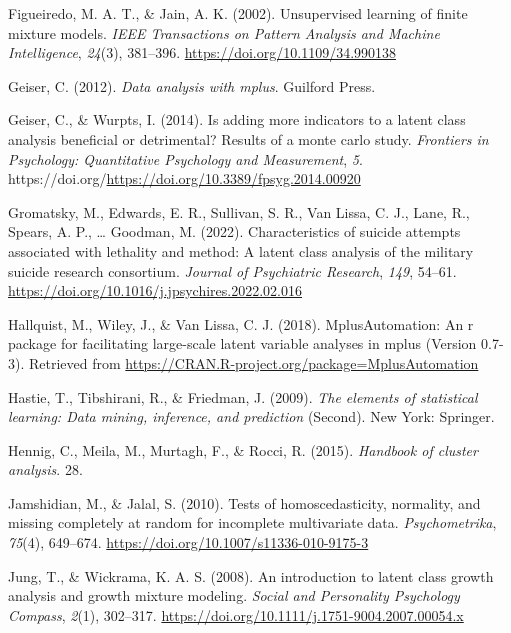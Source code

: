 \documentclass[
  ,man,floatsintext]{apa6}
\newlength{\cslhangindent}
\newlength{\cslentryspacingunit} %
\newenvironment{CSLReferences}[2] %
 {%
  \setlength{\parindent}{0pt}
  \ifodd #1
  \let\oldpar\par
  \def\par{\hangindent=\cslhangindent\oldpar}
  \fi
  \setlength{\parskip}{#2\cslentryspacingunit}
 }%
 {}
\begin{document}
\begin{CSLReferences}{1}{0}
\leavevmode{}%
Figueiredo, M. A. T., \& Jain, A. K. (2002). Unsupervised learning of finite mixture models. \emph{{IEEE} Transactions on Pattern Analysis and Machine Intelligence}, \emph{24}(3), 381--396. \url{https://doi.org/10.1109/34.990138}

\leavevmode{}%
Geiser, C. (2012). \emph{Data analysis with mplus}. Guilford Press.

\leavevmode{}%
Geiser, C., \& Wurpts, I. (2014). Is adding more indicators to a latent class analysis beneficial or detrimental? Results of a monte carlo study. \emph{Frontiers in Psychology: Quantitative Psychology and Measurement}, \emph{5}. https://doi.org/\url{https://doi.org/10.3389/fpsyg.2014.00920}

\leavevmode{}%
Gromatsky, M., Edwards, E. R., Sullivan, S. R., Van Lissa, C. J., Lane, R., Spears, A. P., \ldots{} Goodman, M. (2022). Characteristics of suicide attempts associated with lethality and method: A latent class analysis of the military suicide research consortium. \emph{Journal of Psychiatric Research}, \emph{149}, 54--61. \url{https://doi.org/10.1016/j.jpsychires.2022.02.016}

\leavevmode{}%
Hallquist, M., Wiley, J., \& Van Lissa, C. J. (2018). {MplusAutomation}: An r package for facilitating large-scale latent variable analyses in mplus (Version 0.7-3). Retrieved from \url{https://CRAN.R-project.org/package=MplusAutomation}

\leavevmode{}%
Hastie, T., Tibshirani, R., \& Friedman, J. (2009). \emph{The elements of statistical learning: Data mining, inference, and prediction} (Second). New York: Springer.

\leavevmode{}%
Hennig, C., Meila, M., Murtagh, F., \& Rocci, R. (2015). \emph{Handbook of cluster analysis}. 28.

\leavevmode{}%
Jamshidian, M., \& Jalal, S. (2010). Tests of homoscedasticity, normality, and missing completely at random for incomplete multivariate data. \emph{Psychometrika}, \emph{75}(4), 649--674. \url{https://doi.org/10.1007/s11336-010-9175-3}

\leavevmode{}%
Jung, T., \& Wickrama, K. A. S. (2008). An introduction to latent class growth analysis and growth mixture modeling. \emph{Social and Personality Psychology Compass}, \emph{2}(1), 302--317. \url{https://doi.org/10.1111/j.1751-9004.2007.00054.x}


\end{CSLReferences}
\end{document}
